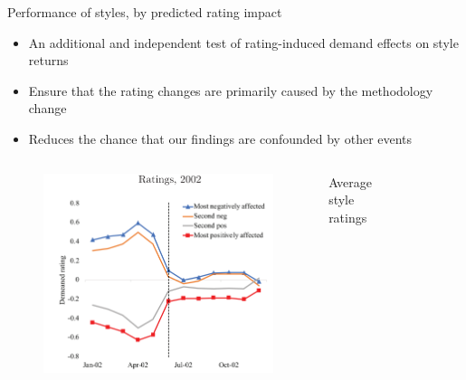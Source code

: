 \documentclass[UTF8, 16pt]{beamer}
\begin{document}
\begin{CJK*}{UTF8}{gbsn}
\begin{frame}{Performance of styles, by predicted rating impact}
	\begin{itemize}
		\item An additional and independent test of rating-induced demand effects on style returns
		\item Ensure that the rating changes are \alert{primarily caused by the methodology change}
		\item Reduces the chance that our findings are confounded by \alert{other events}
	\end{itemize}
	\begin{columns}
		\begin{figure}[htpb]
		  \begin{center}
		    \includegraphics[width=1  \linewidth]
		    {pic/event_ratings.png}
		  \end{center}
		\end{figure}
		\vspace{-0.6cm}
		\center\tiny{Average style ratings}
		\begin{figure}[htpb]
		  \begin{center}

\end{center}
\end{figure}
\end{columns}
\end{frame}
\end{CJK*}
\end{document}
